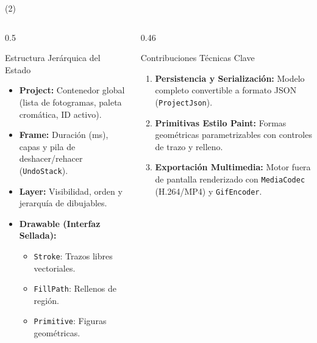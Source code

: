 \begin{frame}{\citetitle{\EntradaBibtex} (2)}
  \begin{columns}[T]
    \begin{column}{0.5\textwidth}
      \begin{block}{Estructura Jerárquica del Estado}
        \begin{itemize}
          \item \textbf{Project:} Contenedor global (lista de fotogramas, paleta cromática, ID activo).
          \item \textbf{Frame:} Duración (ms), capas y pila de deshacer/rehacer (\texttt{UndoStack}).
          \item \textbf{Layer:} Visibilidad, orden y jerarquía de dibujables.
          \item \textbf{Drawable (Interfaz Sellada):}
            \begin{itemize}
              \item \texttt{Stroke}: Trazos libres vectoriales.
              \item \texttt{FillPath}: Rellenos de región.
              \item \texttt{Primitive}: Figuras geométricas.
            \end{itemize}
        \end{itemize}
      \end{block}
    \end{column}

    \begin{column}{0.46\textwidth}
      \begin{block}{Contribuciones Técnicas Clave}
        \begin{enumerate}
          \item \textbf{Persistencia y Serialización:} Modelo completo convertible a formato JSON (\texttt{ProjectJson}).
          \item \textbf{Primitivas Estilo Paint:} Formas geométricas parametrizables con controles de trazo y relleno.
          \item \textbf{Exportación Multimedia:} Motor fuera de pantalla renderizado con \texttt{MediaCodec} (H.264/MP4) y \texttt{GifEncoder}.
        \end{enumerate}
      \end{block}
    \end{column}
  \end{columns}
\end{frame}

